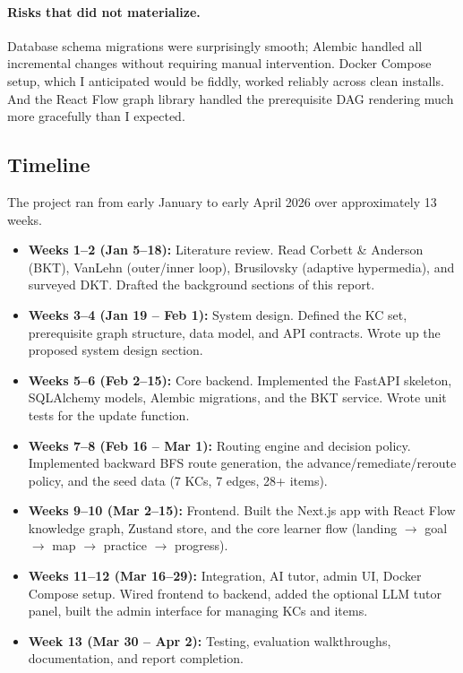 \documentclass{article}
\begin{document}
\paragraph{Risks that did not materialize.}
Database schema migrations were surprisingly smooth; Alembic handled all incremental changes without requiring manual intervention. Docker Compose setup, which I anticipated would be fiddly, worked reliably across clean installs. And the React Flow graph library handled the prerequisite DAG rendering much more gracefully than I expected.

\subsection{Timeline}

The project ran from early January to early April 2026 over approximately 13 weeks.

\begin{itemize}
    \item \textbf{Weeks 1--2 (Jan 5--18):} Literature review. Read Corbett \& Anderson (BKT), VanLehn (outer/inner loop), Brusilovsky (adaptive hypermedia), and surveyed DKT. Drafted the background sections of this report.
    \item \textbf{Weeks 3--4 (Jan 19 -- Feb 1):} System design. Defined the KC set, prerequisite graph structure, data model, and API contracts. Wrote up the proposed system design section.
    \item \textbf{Weeks 5--6 (Feb 2--15):} Core backend. Implemented the FastAPI skeleton, SQLAlchemy models, Alembic migrations, and the BKT service. Wrote unit tests for the update function.
    \item \textbf{Weeks 7--8 (Feb 16 -- Mar 1):} Routing engine and decision policy. Implemented backward BFS route generation, the advance/remediate/reroute policy, and the seed data (7 KCs, 7 edges, 28+ items).
    \item \textbf{Weeks 9--10 (Mar 2--15):} Frontend. Built the Next.js app with React Flow knowledge graph, Zustand store, and the core learner flow (landing $\to$ goal $\to$ map $\to$ practice $\to$ progress).
    \item \textbf{Weeks 11--12 (Mar 16--29):} Integration, AI tutor, admin UI, Docker Compose setup. Wired frontend to backend, added the optional LLM tutor panel, built the admin interface for managing KCs and items.
    \item \textbf{Week 13 (Mar 30 -- Apr 2):} Testing, evaluation walkthroughs, documentation, and report completion.
\end{itemize}
\end{document}
